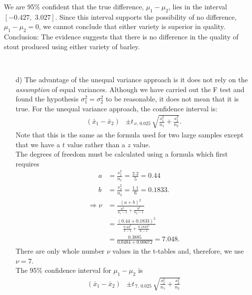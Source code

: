\documentclass[12pt]{article}
\begin{document}
{\begin{minipage}[t]{0.98\textwidth}
\begin{minipage}[t]{0.47\textwidth}
\begin{enumerate}[a)]
We are 95\% confident that the true difference, $\mu_1-\mu_2$, lies in the interval $[-0.427,\,\,3.027]$. Since this interval supports the possibility of no difference, $\mu_1-\mu_2=0$, we cannot conclude that either variety is superior in quality.\\[0.4cm]
Conclusion: The evidence suggests that there is no difference in the quality of stout produced using either variety of barley.
\end{enumerate}
\end{minipage}\hspace{0.04\textwidth}
\begin{minipage}[t]{0.47\textwidth}
\quad\\[-1cm]
\begin{enumerate}
\item[d)] The advantage of the unequal variance approach is it does not rely on the \emph{assumption} of equal variances. Although we have carried out the F test and found the hypothesis $\sigma_1^2 = \sigma_2^2$ to be reasonable, it does not mean that it is true.
    For the unequal variance approach, the confidence interval is:
\begin{align*}
(\bar x_1 - \bar x_2) &\pm t_{\,\nu,\,0.025} \, \sqrt{\frac{s_1^2}{n_1}+\frac{s_2^2}{n_2}}.
\end{align*}
Note that this is the same as the formula used for two large samples except that we have a $t$ value rather than a $z$ value.\\[0.3cm]
The degrees of freedom must be calculated using a formula which first requires
\begin{align*}
a &= \frac{s_1^2}{n_1} = \frac{2.2}{5} = 0.44 \\[0.2cm]
b &= \frac{s_2^2}{n_2} = \frac{1.1}{6} = 0.1833.
\end{align*}
\begin{align*}
\Rightarrow \nu &= \frac{(a+b)^2}{\frac{a^2}{n_1-1}+\frac{b^2}{n_2-1}} \\[0.2cm]
&= \frac{(0.44+0.1833)^2}{\frac{0.44^2}{5-1}+\frac{0.1833^2}{6-1}} \\[0.2cm]
&= \frac{0.3885}{0.0484+0.00672} = 7.048.
\end{align*}
There are only whole number $\nu$ values in the t-tables and, therefore, we use $\nu = 7$.\\[0.4cm]
The 95\% confidence interval for $\mu_1-\mu_2$ is
\begin{align*}
(\bar x_1 - \bar x_2) &\pm t_{\,7,\,0.025} \, \sqrt{\frac{s_1^2}{n_1}+\frac{s_2^2}{n_2}} \\[0.2cm]

\end{align*}
\end{enumerate}
\end{minipage}
\end{minipage}}
\end{document}
